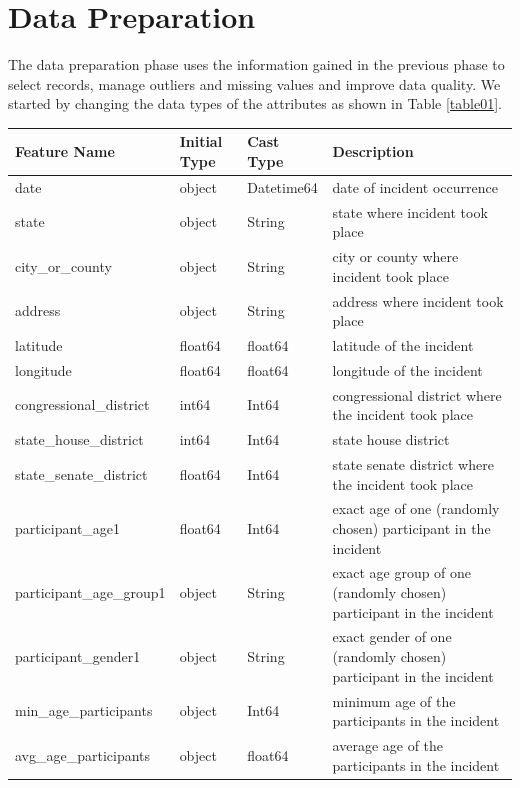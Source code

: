 \documentclass[11pt,a4paper]{report}
\begin{document}
\chapter{Data Preparation}

The data preparation phase uses the information gained in the previous phase to select records, manage outliers and missing values and improve data quality.
We started by changing the data types of the attributes as shown in Table \ref{table01}.

\begin{table}
	\centering
	\begin{small}
	\begin{tabular}{|l|l|l|p{7cm}|}
		\hline
		\textbf{Feature Name} & \textbf{Initial Type} & \textbf{Cast Type} & \textbf{Description}\\
		\hline
		date & object & Datetime64 & date of incident occurrence\\
		\hline
		state & object & String & state where incident took place\\
		\hline
		city\_or\_county & object & String & city or county where incident took place\\
		\hline
		address & object & String & address where incident took place\\
		\hline
		latitude & float64 & float64 & latitude of the incident\\
		\hline
		longitude & float64 & float64 & longitude of the incident\\
		\hline
		congressional\_district & int64 & Int64 & congressional district where the incident took place\\
		\hline
		state\_house\_district & int64 & Int64 & state house district\\
		\hline
		state\_senate\_district & float64 & Int64 & state senate district where the incident took place\\
		\hline
		participant\_age1 & float64 & Int64 & exact age of one (randomly chosen) participant in the incident\\
		\hline
		participant\_age\_group1 & object & String & exact age group of one (randomly chosen) participant in the incident\\
		\hline
		participant\_gender1 & object & String & exact gender of one (randomly chosen) participant in the incident\\
		\hline
		min\_age\_participants & object & Int64 & minimum age of the participants in the incident\\
		\hline
		avg\_age\_participants & object & float64 & average age of the participants in the incident\\

\end{tabular}
\end{small}
\end{table}
\end{document}
